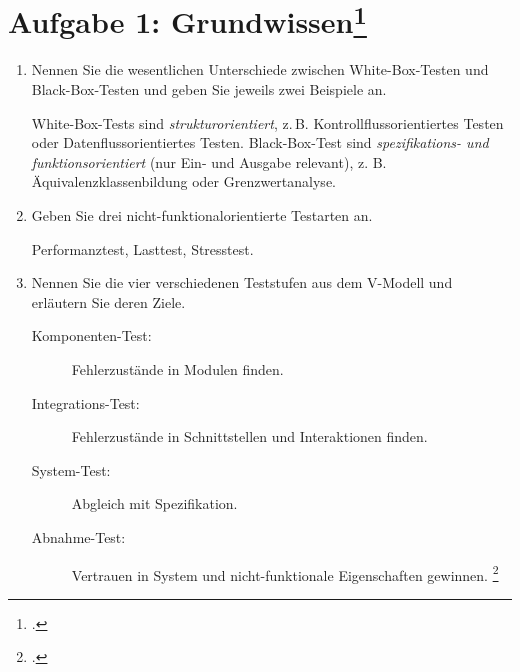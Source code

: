 \documentclass{lehramt-informatik}
\begin{document}
\section{Aufgabe 1: Grundwissen\footcite{sosy:ab:7}}

\begin{enumerate}


\item Nennen Sie die wesentlichen Unterschiede zwischen White-Box-Testen
und Black-Box-Testen und geben Sie jeweils zwei Beispiele an.

\begin{antwort}
White-Box-Tests sind \emph{strukturorientiert}, z.\,B.
Kontrollflussorientiertes Testen oder Datenflussorientiertes Testen.
Black-Box-Test sind \emph{spe\-zifi\-kations- und funktionsorientiert} (nur
Ein- und Ausgabe relevant), z. B. Äquivalenzklassenbildung oder
Grenzwertanalyse.
\end{antwort}


\item Geben Sie drei nicht-funktionalorientierte Testarten an.

\begin{antwort}
Performanztest, Lasttest, Stresstest.
\end{antwort}


\item Nennen Sie die vier verschiedenen Teststufen aus dem V-Modell und
erläutern Sie deren Ziele.

\begin{antwort}
\begin{description}
\item[Komponenten-Test:]
Fehlerzustände in Modulen finden.

\item[Integrations-Test:]
Fehlerzustände in Schnittstellen und Interaktionen finden.

\item[System-Test:]
Abgleich mit Spezifikation.

\item[Abnahme-Test:]
Vertrauen in System und nicht-funktionale Eigenschaften gewinnen.
\footcite[Seite 50, Abbildung 3.2]{schatten}
\end{description}
\end{antwort}



\end{enumerate}
\end{document}
